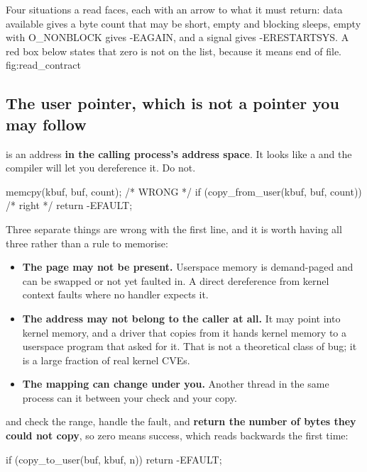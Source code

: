   {Four situations a read faces, each with an arrow to what it must return: data available gives a byte
   count that may be short, empty and blocking sleeps, empty with O\_NONBLOCK gives -EAGAIN, and a
   signal gives -ERESTARTSYS. A red box below states that zero is not on the list, because it means
   end of file.}
  {fig:read_contract}

\subsection{The user pointer, which is not a pointer you may follow}
\label{c5:app:a5}

 is an address \textbf{in the calling process's address space}. It looks like a  and the compiler will let you dereference it. Do not.

\begin{ccode}
memcpy(kbuf, buf, count);              /* WRONG */
if (copy_from_user(kbuf, buf, count))  /* right */
        return -EFAULT;
\end{ccode}

\noindent Three separate things are wrong with the first line, and it is worth having all three
rather than a rule to memorise:
\begin{itemize}
  \item \textbf{The page may not be present.} Userspace memory is demand-paged and can be swapped or
    not yet faulted in. A direct dereference from kernel context faults where no handler expects it.
  \item \textbf{The address may not belong to the caller at all.} It may point into kernel memory,
    and a driver that copies from it hands kernel memory to a userspace program that asked for it.
    That is not a theoretical class of bug; it is a large fraction of real kernel CVEs.
  \item \textbf{The mapping can change under you.} Another thread in the same process can
     it between your check and your copy.
\end{itemize}
 and  check the range, handle the fault, and \textbf{return
the number of bytes they could not copy}, so zero means success, which reads backwards the first
time:

\begin{ccode}
if (copy_to_user(buf, kbuf, n))
        return -EFAULT;
\end{ccode}


